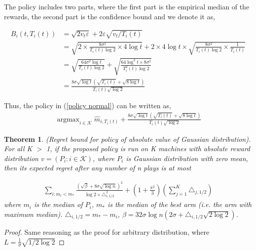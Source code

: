 \documentclass{article}
\DeclareMathOperator*{\argmax}{argmax}
\theoremstyle{plain}
\newtheorem{theo}{Theorem}
\begin{document}
The policy includes two parts, where the first part is the empirical median of the rewards, the second part is the confidence bound and we denote it as,

\begin{align}
\label{B_i(i, T_i(t)) definition}
B_i(t, T_i(t)) &= \sqrt{2v_t \varepsilon} + 2 \varepsilon \sqrt{v_t/T_i(t)}\\
&= \sqrt{2 \times \frac{8\sigma^2}{T_i(t)  \log 2} \times 4 \log t} + 2 \times 4 \log t \times \sqrt{\frac{8\sigma^2}{T_i(t)  \log 2} \times \frac{1}{T_i(t)}}\\
&= \sqrt{\frac{64 \sigma^2 \log t  }{T_i(t) \log 2}} + \sqrt{\frac{64 \log^2 t \times 8 \sigma^2}{T_i^2(t) \log 2}}\\
\label{B_i(i, T_i(t)) definition 2}
&= \frac{8 \sigma \sqrt{\log t} (\sqrt{ T_i(t)} + \sqrt{8\log t})}{ T_i(t)  \sqrt{\log 2}}
\end{align}

Thus, the policy in (\ref{policy normal}) can be written as,
\begin{align}
    \argmax_{i \in \mathcal{K}} \hat{m}_{i, T_i(t)} + \frac{8 \sigma \sqrt{\log t} (\sqrt{ T_i(t)} + \sqrt{8\log t})}{ T_i(t)  \sqrt{\log 2}}
\end{align}

\begin{theo}
(Regret bound for policy of absolute value of Gaussian distribution). \\

For all K $>$ 1, if the proposed policy is run on K machines with absolute reward distribution $v = (P_i: i \in \mathcal{K})$, where $P_i$ is Gaussian distribution with zero mean, then its expected regret after any number of n plays is at most

\begin{align}
    \sum_{i: m_i < m_\ast} \frac{(\sqrt{\beta} + 8 \sigma \sqrt{\log n})^2}{\log 2 \times \triangle_{i, 1/2}^2}  + (1 + \frac{\pi^2}{3}) (\sum_{j=1}^K \triangle_{j, 1/2})
\end{align}
where $m_i$ is the median of $P_i$, $m_\ast$ is the median of the best arm (i.e. the arm with maximum median). $\triangle_{i, 1/2} = m_\ast - m_i$, $\beta = 32 \sigma \log n (2 \sigma + \triangle_{i,1/2} \sqrt{2 \log 2} )$.
\end{theo}

\begin{proof}
Same reasoning as the proof for arbitrary distribution, where $L = \frac{1}{\sigma} \sqrt{1/2 \log 2}$



\end{proof}
\end{document}
